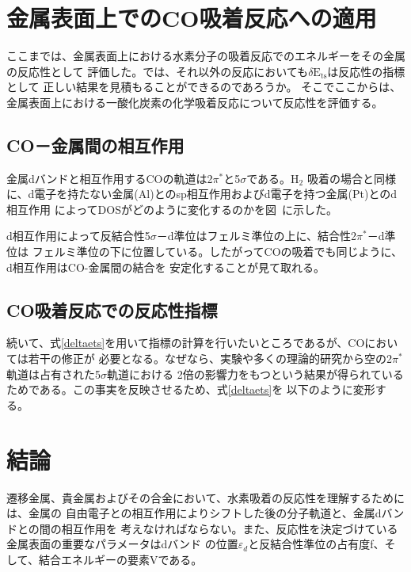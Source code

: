 \documentclass[12pt]{ltjsarticle}
\begin{document}
\section{金属表面上でのCO吸着反応への適用}

ここまでは、金属表面上における水素分子の吸着反応でのエネルギーをその金属の反応性として
評価した。では、それ以外の反応においても$\delta \text{E}_\text{ts}$は反応性の指標として
正しい結果を見積もることができるのであろうか。
そこでここからは、金属表面上における一酸化炭素の化学吸着反応について反応性を評価する。

\subsection{CO－金属間の相互作用}
金属dバンドと相互作用するCOの軌道は2$\pi^*$と5$\sigma$である。$\text{H}_\text{2}$
吸着の場合と同様に、d電子を持たない金属(Al)とのsp相互作用およびd電子を持つ金属(Pt)とのd相互作用
によってDOSがどのように変化するのかを図\   に示した。


d相互作用によって反結合性5$\sigma$－d準位はフェルミ準位の上に、結合性2$\pi^*$－d準位は
フェルミ準位の下に位置している。したがってCOの吸着でも同じように、d相互作用はCO-金属間の結合を
安定化することが見て取れる。

\subsection{CO吸着反応での反応性指標}
続いて、式\ref{deltaets}を用いて指標の計算を行いたいところであるが、COにおいては若干の修正が
必要となる。なぜなら、実験や多くの理論的研究から空の2$\pi^*$軌道は占有された5$\sigma$軌道における
2倍の影響力をもつという結果が得られているためである。この事実を反映させるため、式\ref{deltaets}を
以下のように変形する。



\section{結論}
遷移金属、貴金属およびその合金において、水素吸着の反応性を理解するためには、金属の
自由電子との相互作用によりシフトした後の分子軌道と、金属dバンドとの間の相互作用を
考えなければならない。また、反応性を決定づけている金属表面の重要なパラメータはdバンド
の位置$\varepsilon_d$と反結合性準位の占有度f、そして、結合エネルギーの要素Vである。



\end{document}
